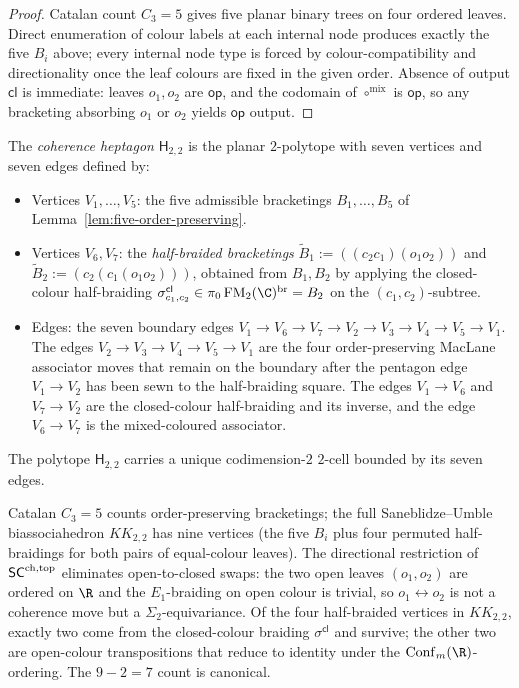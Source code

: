 \begin{proof}
Catalan count $C_3 = 5$ gives five planar binary trees on four ordered
leaves. Direct enumeration of colour labels at each internal node
produces exactly the five $B_i$ above; every internal node type is
forced by colour-compatibility and directionality once the leaf colours
are fixed in the given order. Absence of output $\mathsf{cl}$ is
immediate: leaves $o_1, o_2$ are $\mathsf{op}$, and the codomain of
$\circ^{\mathrm{mix}}$ is $\mathsf{op}$, so any bracketing absorbing
$o_1$ or $o_2$ yields $\mathsf{op}$ output.
\end{proof}

\begin{definition}
\label{def:coherence-heptagon}%
%
%
The \emph{coherence heptagon} $\mathsf{H}_{2,2}$ is the planar
$2$-polytope with seven vertices and seven edges defined by:
\begin{itemize}
\item Vertices $V_1, \ldots, V_5$: the five admissible bracketings
$B_1, \ldots, B_5$ of Lemma~\ref{lem:five-order-preserving}.
\item Vertices $V_6, V_7$: the \emph{half-braided bracketings}
$\widetilde B_1 := ((c_2 c_1)(o_1 o_2))$ and
$\widetilde B_2 := (c_2(c_1(o_1 o_2)))$, obtained from $B_1, B_2$ by
applying the closed-colour half-braiding
$\sigma^{\mathsf{cl}}_{c_1, c_2}\in
\pi_0\,\FM_2(\C)^{\mathrm{br}}=B_2$ on the $(c_1, c_2)$-subtree.
\item Edges: the seven boundary edges
$V_1\to V_6\to V_7\to V_2\to V_3\to V_4\to V_5\to V_1$.
The edges $V_2\to V_3\to V_4\to V_5\to V_1$ are the four
order-preserving MacLane associator moves that remain on the boundary
after the pentagon edge $V_1\to V_2$ has been sewn to the
half-braiding square. The edges $V_1\to V_6$ and $V_7\to V_2$ are
the closed-colour half-braiding and its inverse, and the edge
$V_6\to V_7$ is the mixed-coloured associator.
\end{itemize}
The polytope $\mathsf{H}_{2,2}$ carries a unique codimension-$2$
$2$-cell bounded by its seven edges.
\end{definition}

\begin{remark}
\label{rem:seven-count-justification}%
Catalan $C_3 = 5$ counts order-preserving bracketings; the full
Saneblidze--Umble biassociahedron $KK_{2,2}$ has nine vertices
(the five $B_i$ plus four permuted half-braidings for both
pairs of equal-colour leaves). The directional restriction of
$\mathsf{SC}^{\mathrm{ch},\mathrm{top}}$ eliminates open-to-closed swaps: the two open leaves
$(o_1, o_2)$ are ordered on $\R$ and the $E_1$-braiding on open
colour is trivial, so $o_1 \leftrightarrow o_2$ is not a coherence
move but a $\Sigma_2$-equivariance. Of the four half-braided
vertices in $KK_{2,2}$, exactly two come from the closed-colour
braiding $\sigma^{\mathsf{cl}}$ and survive; the other two are
open-colour transpositions that reduce to identity under the
$\mathrm{Conf}_m(\R)$-ordering. The $9 - 2 = 7$ count is canonical.
\end{remark}

